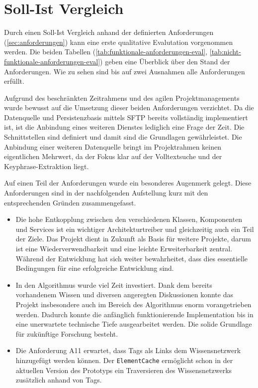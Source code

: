 \section{Soll-Ist Vergleich}

Durch einen Soll-Ist Vergleich anhand der definierten Anforderungen (\autoref{sec:anforderungen}) kann eine erste qualitative Evalutation vorgenommen werden. Die beiden Tabellen (\autoref{tab:funktionale-anforderungen-eval}, \autoref{tab:nicht-funktionale-anforderungen-eval}) geben eine Überblick über den Stand der Anforderungen. Wie zu sehen sind bis auf zwei Ausnahmen alle Anforderungen erfüllt. 

Aufgrund des beschränkten Zeitrahmens und des agilen Projektmanagements wurde bewusst auf die Umsetzung dieser beiden Anforderungen verzichtet. Da die Datenquelle und Persistenzbasis mittels \gls{SFTP} bereits vollständig implementiert ist, ist die Anbindung eines weiteren Dienstes lediglich eine Frage der Zeit. Die Schnittstellen sind definiert und damit sind die Grundlagen gewährleistet. Die Anbindung einer weiteren Datenquelle bringt im Projektrahmen keinen eigentlichen Mehrwert, da der Fokus klar auf der Volltextsuche und der \gls{Keyphrase}-Extraktion liegt.

Auf einen Teil der Anforderungen wurde ein besonderes Augenmerk gelegt. Diese Anforderungen sind in der nachfolgenden Aufstellung kurz mit den entsprechenden Gründen zusammengefasst.

\begin{itemize}
    \item Die hohe Entkopplung zwischen den verschiedenen Klassen, Komponenten und Services ist ein wichtiger Architekturtreiber und gleichzeitig auch ein Teil der Ziele. Das Projekt dient in Zukunft als Basis für weitere Projekte, darum ist eine Wie\-der\-ver\-wend\-bar\-keit und eine leichte Erweiterbarkeit zentral. Während der Entwicklung hat sich weiter bewahrheitet, dass dies essentielle Bedingungen für eine erfolgreiche Entwicklung sind.
    \item In den Algorithmus wurde viel Zeit investiert. Dank dem bereits vorhandenem Wissen und diversen angeregten Diskussionen konnte das Projekt insbesondere auch im Bereich des Algorithmus enorm vorangetrieben werden. Dadurch konnte die anfänglich funktionierende Implementation bis in eine unerwartete technische Tiefe ausgearbeitet werden. Die solide Grundlage für zukünftige Forschung besteht.
    \item Die Anforderung A11 erwartet, dass Tags als Links dem Wissensnetzwerk hinzugefügt werden können. Der \texttt{ElementCache} ermöglicht schon in der aktuellen Version des Prototyps ein Traversieren des Wissensnetzwerks zusätzlich anhand von Tags.
\end{itemize}

